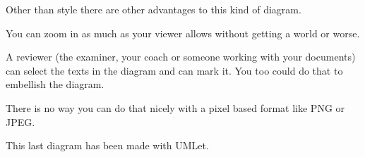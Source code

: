 Other than style there are other advantages to this kind of diagram.
\begin{Itemize}
\item You can zoom in as much as your viewer allows without getting a  world or worse.
\item A reviewer (the examiner, your coach or someone working with your documents) can select the texts in the diagram and can mark it. You too could do that to embellish the diagram.
\item There is no way you can do that nicely with a pixel based format like PNG or JPEG.
\end{Itemize}

This last diagram has been made with UMLet.

